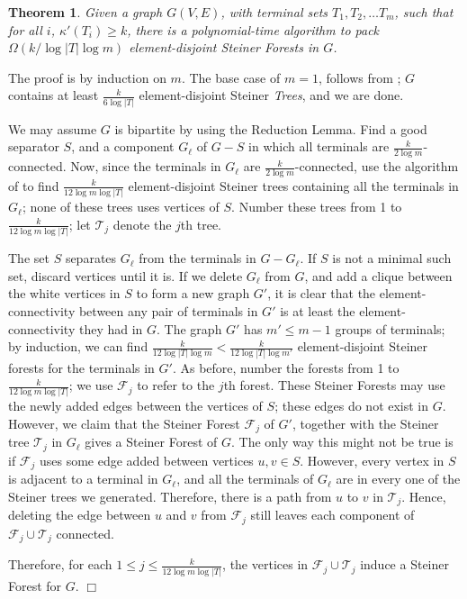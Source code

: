 \documentclass[11pt]{article}
\newtheorem{theorem}[lemma]{Theorem}
\newcommand{\elconn}{\kappa'}
\renewenvironment{proof}{\vspace{-0.1in}\noindent{\bf Proof:}}{\hspace*{\fill}$\Box$\par}
\def\script#1{\mathcal{#1}}
\begin{document}
\begin{theorem}
  \label{thm:packGeneral}
 Given a graph $G(V,E)$, with terminal sets $T_1, T_2,
  \ldots T_m$, such that for all $i$, $\elconn(T_i) \ge k$, there is a
  polynomial-time algorithm to pack $\Omega(k / \log |T| \log m)$
  element-disjoint Steiner Forests in $G$.
\end{theorem}
\begin{proof}
  The proof is by induction on $m$. The base case of $m = 1$, follows
  from \cite{cs,CalinescuCV07}; $G$ contains at least $\frac{k}{6 \log |T|}$
  element-disjoint Steiner \emph{Trees}, and we are done.

  We may assume $G$ is bipartite by using the Reduction Lemma. Find a
  good separator $S$, and a component $G_\ell$ of $G-S$ in which all
  terminals are $\frac{k}{2 \log m}$-connected.  Now, since the
  terminals in $G_\ell$ are $\frac{k}{2 \log m}$-connected, use the
  algorithm of \cite{cs} to find $\frac{k}{12 \log m \log |T|}$
  element-disjoint Steiner trees containing all the terminals in
  $G_\ell$; none of these trees uses vertices of $S$.  Number these
  trees from 1 to $\frac{k}{12 \log m \log |T|}$; let $\script{T}_j$
  denote the $j$th tree.

  The set $S$ separates $G_\ell$ from the terminals in $G -
  G_\ell$. If $S$ is not a minimal such set, discard vertices until it
  is. If we delete $G_\ell$ from $G$, and add a clique between the
  white vertices in $S$ to form a new graph $G'$, it is clear that the
  element-connectivity between any pair of terminals in $G'$ is at
  least the element-connectivity they had in $G$.  The graph $G'$ has
  $m' \le m-1$ groups of terminals; by induction, we can find
  $\frac{k}{12 \log |T| \log m} < \frac{k}{12 \log |T| \log m'}$
  element-disjoint Steiner forests for the terminals in $G'$. As
  before, number the forests from 1 to $\frac{k}{12 \log m \log |T|}$;
  we use $\script{F}_j$ to refer to the $j$th forest. These Steiner
  Forests may use the newly added edges between the vertices of $S$;
  these edges do not exist in $G$.  However, we claim that the Steiner
  Forest $\script{F}_j$ of $G'$, together with the Steiner tree
  $\script{T}_j$ in $G_\ell$ gives a Steiner Forest of $G$. The only
  way this might not be true is if $\script{F}_j$ uses some edge added
  between vertices $u,v \in S$. However, every vertex in $S$ is
  adjacent to a terminal in $G_\ell$, and all the terminals of
  $G_\ell$ are in every one of the Steiner trees we
  generated. Therefore, there is a path from $u$ to $v$ in
  $\script{T}_j$. Hence, deleting the edge between $u$ and $v$ from
  $\script{F}_j$ still leaves each component of $\script{F}_j \cup
  \script{T}_j$ connected.

  Therefore, for each $1 \le j \le \frac{k}{12 \log m \log |T|}$, the
  vertices in $\script{F}_j \cup \script{T}_j$ induce a Steiner Forest
  for $G$.
\end{proof}
\end{document}
